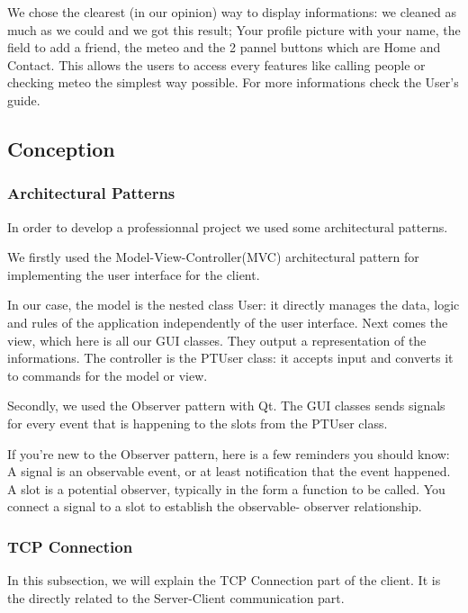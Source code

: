 \documentclass{article}
\begin{document}
  \bigskip
  We chose the clearest (in our opinion) way to display informations: we cleaned as much as we could and we got this result; Your profile picture with your name, the field to add a friend, the meteo and the 2 pannel buttons which are Home and Contact.
  This allows the users to access every features like calling people or checking meteo the simplest way possible. For more informations check the User's guide.

  \newpage

  \subsection{Conception}

  \subsubsection{Architectural Patterns}

  In order to develop a professionnal project we used some architectural patterns.

  \bigskip
  We firstly used the Model-View-Controller(MVC) architectural pattern for implementing the user interface for the client.

 In our case, the model is the nested class User: it directly manages the data, logic and rules of the application independently of the user interface.
 Next comes the view, which here is all our GUI classes. They output a representation of the informations.
 The controller is the PTUser class: it accepts input and converts it to commands for the model or view.
 \bigskip

 Secondly, we used the Observer pattern with Qt. The GUI classes sends signals for every event that is happening to the slots from the PTUser class.

 \bigskip

 If you're new to the Observer pattern, here is a few reminders you should know:
 A signal is an observable event, or at least notification that the event happened.
 A slot is a potential observer, typically in the form a function to be called.
 You connect a signal to a slot to establish the observable- observer relationship.

 \newpage
 \subsubsection{TCP Connection}

 In this subsection, we will explain the TCP Connection part of the client. It is the directly related to the Server-Client communication part.
\end{document}
